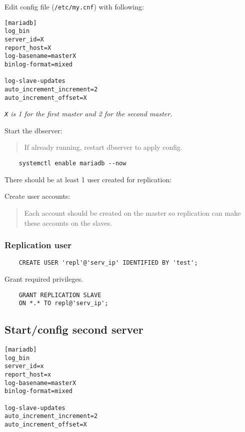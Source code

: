 Edit config file (\verb*|/etc/my.cnf|) with following:

\begin{lstlisting}
[mariadb]
log_bin
server_id=X
report_host=X
log-basename=masterX
binlog-format=mixed

log-slave-updates
auto_increment_increment=2
auto_increment_offset=X
\end{lstlisting}

\emph{\verb*|X| is 1 for the first master and 2 for the second master.}

Start the dbserver:

\begin{quote}
    If already running, restart dbserver to apply config.
\end{quote}

\begin{lstlisting}
    systemctl enable mariadb --now
\end{lstlisting}

There should be at least 1 user created for replication:

Create user accounts:

\begin{quote}
    Each account should be created on the master so replication can make these accounts on the slaves.
\end{quote}

\subsubsection{Replication user}

\begin{lstlisting}
    CREATE USER 'repl'@'serv_ip' IDENTIFIED BY 'test';
\end{lstlisting}

Grant required privileges.

\begin{lstlisting}
    GRANT REPLICATION SLAVE
    ON *.* TO repl@'serv_ip';
\end{lstlisting}

\subsection{Start/config second server}

\begin{lstlisting}
[mariadb]
log_bin
server_id=x
report_host=x
log-basename=masterX
binlog-format=mixed

log-slave-updates
auto_increment_increment=2
auto_increment_offset=X
\end{lstlisting}

